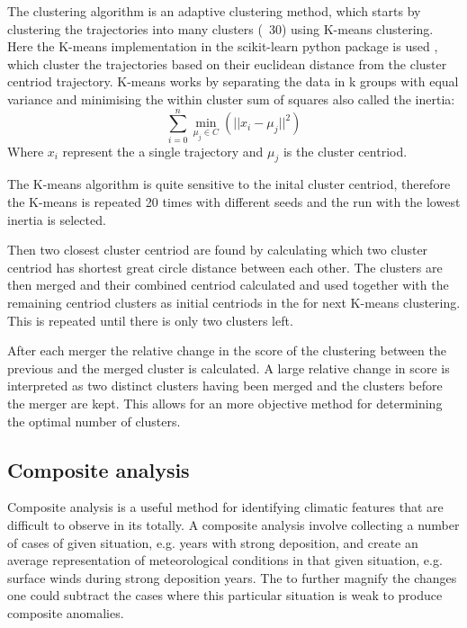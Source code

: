 The \textcite{dorling1992cluster} clustering algorithm is an adaptive clustering method, which starts by clustering the trajectories into many clusters (~30) using K-means clustering. Here the K-means implementation in the scikit-learn python package is used \parencite{scikit-learn}, which cluster the trajectories based on their euclidean distance from the cluster centriod trajectory. K-means works by separating the data in k groups with equal variance and minimising the within cluster sum of squares also called the inertia: 
\begin{equation}
    \sum_{i=0}^{n}\min_{\mu_j \in C}(||x_i - \mu_j||^2)
\end{equation}
Where $x_i$ represent the a single trajectory and $\mu_j$ is the cluster centriod. 

The K-means algorithm is quite sensitive to the inital cluster centriod, therefore the K-means is repeated 20 times with different seeds and the run with the lowest inertia is selected. 

Then two closest cluster centriod are found by calculating which two cluster centriod has shortest great circle distance between each other. The clusters are then merged and their combined centriod calculated and used together with the remaining centriod clusters as initial centriods in the for next K-means clustering. This is repeated until there is only two clusters left. 

After each merger the relative change in the score of the clustering between the previous and the merged cluster is calculated. A large relative change in score is interpreted as two distinct clusters having been merged and the clusters before the merger are kept. This allows for an more objective method for determining the optimal number of clusters.    

\subsection{Composite analysis}

Composite analysis is a useful method for identifying climatic features that are difficult to observe in its totally. A composite analysis involve collecting a number of cases of given situation, e.g. years with strong deposition, and create an average representation of meteorological conditions in that given situation, e.g. surface winds during strong deposition years. The to further magnify the changes one could subtract the cases where this particular situation is weak to produce composite anomalies.      

